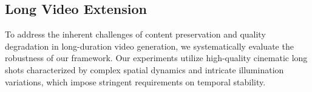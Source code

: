 \documentclass[runningheads]{llncs}
\begin{document}
\subsection{Long Video Extension}
To address the inherent challenges of content preservation and quality degradation in long-duration video generation, we systematically evaluate the robustness of our framework. 
Our experiments utilize high-quality cinematic long shots characterized by complex spatial dynamics and intricate illumination variations, which impose stringent requirements on temporal stability. 
\end{document}

